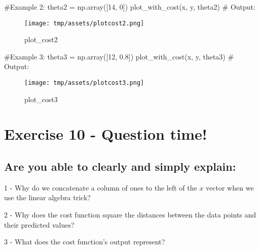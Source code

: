 \documentclass[]{article}
\newenvironment{Shaded}{\begin{snugshade}}{\end{snugshade}}
\newcommand{\CommentTok}[1]{\textcolor[rgb]{0.48,0.49,0.49}{#1}}
\newcommand{\DecValTok}[1]{\textcolor[rgb]{0.96,0.45,0.00}{#1}}
\newcommand{\FloatTok}[1]{\textcolor[rgb]{0.96,0.45,0.00}{#1}}
\newcommand{\NormalTok}[1]{\textcolor[rgb]{0.81,0.81,0.76}{#1}}
\newcommand{\OperatorTok}[1]{\textcolor[rgb]{0.81,0.81,0.76}{#1}}
\begin{document}
\begin{Shaded}
\begin{Highlighting}[]
\CommentTok{#Example 2:}
\NormalTok{theta2 }\OperatorTok{=}\NormalTok{ np.array([}\DecValTok{14}\NormalTok{, }\DecValTok{0}\NormalTok{])}
\NormalTok{plot_with_cost(x, y, theta2)}
\CommentTok{# Output:}
\end{Highlighting}
\end{Shaded}

\begin{figure}
\centering
\texttt{[image: tmp/assets/plotcost2.png]}
\caption{plot\_cost2}
\end{figure}

\newpage

\begin{Shaded}
\begin{Highlighting}[]
\CommentTok{#Example 3:}
\NormalTok{theta3 }\OperatorTok{=}\NormalTok{ np.array([}\DecValTok{12}\NormalTok{, }\FloatTok{0.8}\NormalTok{])}
\NormalTok{plot_with_cost(x, y, theta3)}
\CommentTok{# Output:}
\end{Highlighting}
\end{Shaded}

\begin{figure}
\centering
\texttt{[image: tmp/assets/plotcost3.png]}
\caption{plot\_cost3}
\end{figure}

\clearpage

\hypertarget{exercise-10---question-time-1}{%
\section{Exercise 10 - Question
time!}\label{exercise-10---question-time-1}}

\hypertarget{are-you-able-to-clearly-and-simply-explain}{%
\subsection{Are you able to clearly and simply
explain:}\label{are-you-able-to-clearly-and-simply-explain}}

1 - Why do we concatenate a column of ones to the left of the \(x\)
vector when we use the linear algebra trick?

2 - Why does the cost function square the distances between the data
points and their predicted values?

3 - What does the cost function's output represent?
\end{document}
